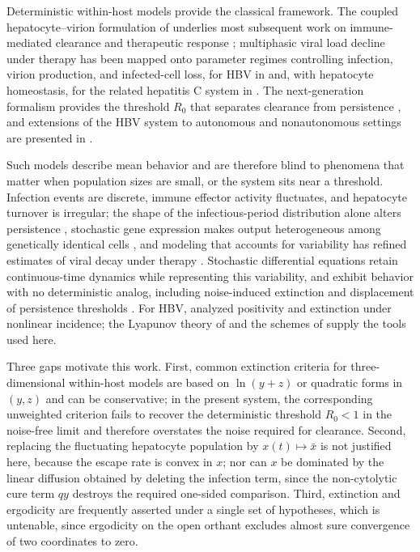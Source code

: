 \documentclass{article}
\newcommand{\Rz}{R_0}
\begin{document}
Deterministic within-host models provide the classical framework. The coupled hepatocyte--virion formulation of \citet{Ref0} underlies most subsequent work on immune-mediated clearance and therapeutic response \citep{nowak1996,bangham1996,perelson2002,Ref9,Ref10}; multiphasic viral load decline under therapy has been mapped onto parameter regimes controlling infection, virion production, and infected-cell loss, for HBV in \citet{Ref12,Ref13} and, with hepatocyte homeostasis, for the related hepatitis C system in \citet{Ref15}. The next-generation formalism provides the threshold $\Rz$ that separates clearance from persistence \citep{Ref31}, and extensions of the HBV system to autonomous and nonautonomous settings are presented in \citet{Abdallah3,abdallah2}.

Such models describe mean behavior and are therefore blind to phenomena that matter when population sizes are small, or the system sits near a threshold. Infection events are discrete, immune effector activity fluctuates, and hepatocyte turnover is irregular; the shape of the infectious-period distribution alone alters persistence \citep{lloyd2001}, stochastic gene expression makes output heterogeneous among genetically identical cells \citep{ribeiro2005}, and modeling that accounts for variability has refined estimates of viral decay under therapy \citep{guedj2010}. Stochastic differential equations retain continuous-time dynamics while representing this variability, and exhibit behavior with no deterministic analog, including noise-induced extinction and displacement of persistence thresholds \citep{gardiner2004handbook,Ref29,Ref32,Ref33,Ref34}. For HBV, \citet{Ref28} analyzed positivity and extinction under nonlinear incidence; the Lyapunov theory of \citet{Ref1} and the schemes of \citet{kloeden2013numerical,higham2001algorithmic} supply the tools used here.

Three gaps motivate this work. First, common extinction criteria for three-dimensional within-host models are based on $\ln(y+z)$ or quadratic forms in $(y,z)$ and can be conservative; in the present system, the corresponding unweighted criterion fails to recover the deterministic threshold $\Rz<1$ in the noise-free limit and therefore overstates the noise required for clearance. Second, replacing the fluctuating hepatocyte population by $x(t)\mapsto\bar{x}$ is not justified here, because the escape rate is convex in $x$; nor can $x$ be dominated by the linear diffusion obtained by deleting the infection term, since the non-cytolytic cure term $qy$ destroys the required one-sided comparison. Third, extinction and ergodicity are frequently asserted under a single set of hypotheses, which is untenable, since ergodicity on the open orthant excludes almost sure convergence of two coordinates to zero.
\end{document}
